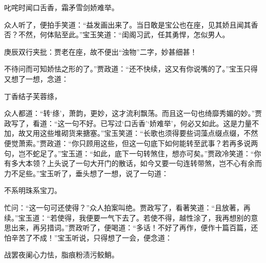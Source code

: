 \begin{poem}
    \begin{pl}
        叱咤时闻口舌香，霜矛雪剑娇难举。
    \end{pl}
\end{poem}


\begin{parag}
    众人听了，便拍手笑道：“益发画出来了。当日敢是宝公也在座，见其娇且闻其香否？不然，何体贴至此。”宝玉笑道：“闺阁习武，任其勇悍，怎似男人。\begin{note}庚辰双行夹批：贾老在座，故不便出“浊物”二字，妙甚细甚！\end{note}不待问而可知娇怯之形的了。”贾政道：“还不快续，这又有你说嘴的了。”宝玉只得又想了一想，念道：
\end{parag}


\begin{poem}
    \begin{pl}
        丁香结子芙蓉绦，
    \end{pl}
\end{poem}


\begin{parag}
    众人都道：“转‘绦’，萧韵，更妙，这才流利飘荡。而且这一句也绮靡秀媚的妙。”贾政写了，看道：“这一句不好。已写过‘口舌香’‘娇难举’，何必又如此。这是力量不加，故又用这些堆砌货来搪塞。”宝玉笑道：“长歌也须得要些词藻点缀点缀，不然便觉萧索。”贾政道：“你只顾用这些，但这一句底下如何能转至武事？若再多说两句，岂不蛇足了。”宝玉道：“如此，底下一句转煞住，想亦可矣。”贾政冷笑道：“你有多大本领？上头说了一句大开门的散话，如今又要一句连转带煞，岂不心有余而力不足些。”宝玉听了，垂头想了一想，说了一句道：
\end{parag}


\begin{poem}
    \begin{pl}
        不系明珠系宝刀。
    \end{pl}
\end{poem}


\begin{parag}
    忙问：“这一句可还使得？”众人拍案叫绝。贾政写了，看著笑道：“且放著，再续。”宝玉道：“若使得，我便要一气下去了。若使不得，越性涂了，我再想别的意思出来，再另措词。”贾政听了，便喝道：“多话！不好了再作，便作十篇百篇，还怕辛苦了不成！”宝玉听说，只得想了一会，便念道：
\end{parag}


\begin{poem}
    \begin{pl}
        战罢夜阑心力怯，脂痕粉渍污鲛鮹。
    \end{pl}
\end{poem}


